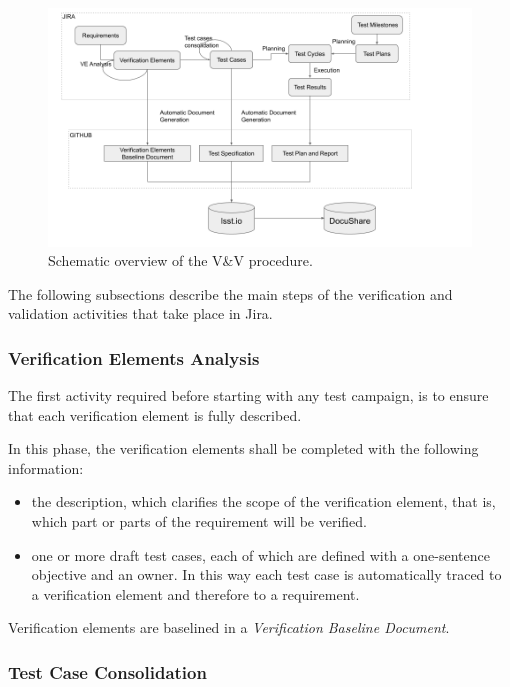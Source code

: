 \begin{figure}
\begin{center}
\includegraphics[width=\textwidth]{imgs/VandVprocedure.png}
 \caption{Schematic overview of the V\&V procedure.}
 \label{fig:vandvproc}
\end{center}
\end{figure}

The following subsections describe the main steps of the verification and validation activities that take place in Jira.


\subsubsection{Verification Elements Analysis}

The first activity required before starting with any test campaign, is to ensure that each verification element is fully described.

In this phase, the verification elements shall be completed with the following information:
\begin{itemize}
\item the description, which clarifies the scope of the verification element, that is, which part or parts of the requirement will be verified.
\item one or more draft test cases, each of which are defined with a one-sentence objective and an owner. 
In this way each test case is automatically traced to a verification element and therefore to a requirement.
\end{itemize}
Verification elements are baselined in a \textit{Verification Baseline Document}.


\subsubsection{Test Case Consolidation}

